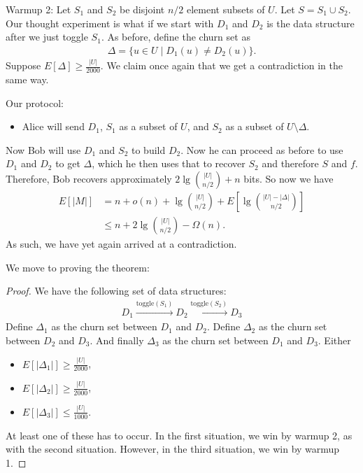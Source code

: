 \documentclass{report}
\begin{document}
\noindent Warmup 2: Let $S_1$ and $S_2$ be disjoint $n/2$ element subsets of $U$. Let $S = S_1 \cup S_2$. Our thought experiment is what if we start with $D_1$ and $D_2$ is the data structure after we just toggle $S_1$. As before, define the churn set as 
\begin{align*}
    \Delta = \{u \in U \mid D_1(u) \neq D_2(u)\}.
\end{align*}
Suppose $E[\Delta] \geq \frac{|U|}{2000}$. We claim once again that we get a contradiction in the same way.

\noindent Our protocol:
\begin{itemize}
    \item Alice will send $D_1$, $S_1$ as a subset of $U$, and $S_2$ as a subset of $U \setminus \Delta$. 
\end{itemize}
Now Bob will use $D_1$ and $S_2$ to build $D_2$. Now he can proceed as before to use $D_1$ and $D_2$ to get $\Delta$, which he then uses that to recover $S_2$ and therefore $S$ and $f$. Therefore, Bob recovers approximately $2 \lg \binom{|U|}{n/2} + n$ bits. So now we have 
\begin{align*}
    E[|M|] &= n + o(n) + \lg \binom{|U|}{n/2} + E \left[ \lg \binom{|U| - |\Delta|}{n/2} \right] \\
    &\leq n + 2 \lg \binom{|U|}{n/2} - \Omega(n).
\end{align*}
As such, we have yet again arrived at a contradiction. 

We move to proving the theorem:
\begin{proof}
We have the following set of data structures:
\begin{align*}
    D_1 \xrightarrow{\text{toggle}(S_1)} D_2 \xrightarrow{\text{toggle}(S_2)} D_3
\end{align*}
Define $\Delta_1$ as the churn set between $D_1$ and $D_2$. Define $\Delta_2$ as the churn set between $D_2$ and $D_3$. And finally $\Delta_3$ as the churn set between $D_1$ and $D_3$. Either 
\begin{itemize}
    \item $E[|\Delta_1|] \geq \frac{|U|}{2000}$,
    \item $E[|\Delta_2|] \geq \frac{|U|}{2000}$,
    \item $E[|\Delta_3|] \leq \frac{|U|}{1000}$.
\end{itemize}
At least one of these has to occur. In the first situation, we win by warmup 2, as with the second situation. However, in the third situation, we win by warmup 1. 
\end{proof}
\end{document}
